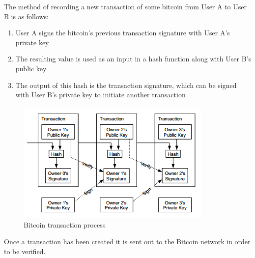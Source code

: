 \documentclass[11pt]{article}
\begin{document}
\begin{minipage}{\linewidth}
The method of recording a new transaction of some bitcoin from User A to User
B is as follows:
\begin{enumerate}
    \item User A signs the bitcoin's previous transaction signature with User
        A's private key
    \item The resulting value is used as an input in a hash function along
        with User B's public key
    \item The output of this hash is the transaction signature, which can be
        signed with User B's private key to initiate another transaction
\end{enumerate}
\end{minipage}
\begin{figure}[H]
    \centering
    \caption[Bitcoin transaction process]{Bitcoin transaction process~\cite{nakamoto08}}
    \includegraphics{figures/transaction.png}
\end{figure}

Once a transaction has been created it is sent out to the Bitcoin network in
order to be verified.
\end{document}
